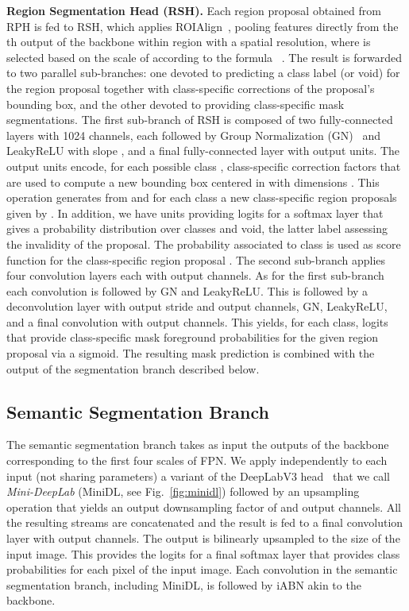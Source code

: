 \documentclass[10pt,twocolumn,letterpaper]{article}
\newcommand{\siABN}{\textrm{iABN}\xspace}
\renewcommand{\paragraph}[1]{
        \vspace{3pt}
	\noindent\textbf{#1}}
\begin{document}
\paragraph{Region Segmentation Head (RSH).}
Each region proposal  obtained from RPH is fed to RSH, which applies ROIAlign~\cite{He2017}, pooling features directly from the th output of the backbone within region  with a  spatial resolution, where  is selected based on the scale of  according to the formula ~\cite{He2017}.
The result is forwarded to two parallel sub-branches: one devoted
to predicting a class label (or void) for the region proposal together with class-specific corrections of the proposal's bounding box, and the other devoted to providing class-specific mask segmentations. 
The first sub-branch of RSH is composed of two fully-connected layers with 1024 channels, each followed by Group Normalization (GN)~\cite{Wu_2018_ECCV} and LeakyReLU with slope , and a final 
fully-connected layer with  output units.
The output units encode, for each possible class , class-specific correction factors  that are used to compute a new bounding box centered in  with dimensions . This operation generates from  and for each class  a new class-specific region proposals given by .
In addition, we have  units providing logits for a softmax layer that gives a probability distribution over classes and void, the latter label assessing the invalidity of the proposal. The probability associated to class  is used as score function  for the class-specific region proposal .
The second sub-branch applies four  convolution layers each with  output channels. As for the first sub-branch each convolution is followed by GN and LeakyReLU.
This is followed by a  deconvolution layer with output stride  and  output channels, GN, LeakyReLU, and a final  convolution with  output channels. This yields, for each class,  logits that provide class-specific mask foreground probabilities for the given region proposal via a sigmoid.
The resulting mask prediction is combined with the output of the segmentation branch described below. 




\subsection{Semantic Segmentation Branch}
\label{sec:sem}
The semantic segmentation branch takes as input the outputs of the backbone corresponding to the first four scales of FPN. We apply independently to each input (not sharing parameters) a variant of the DeepLabV3 head~\cite{Chen2017} that we call \emph{Mini-DeepLab} (MiniDL, see Fig.~\ref{fig:minidl}) followed by an upsampling operation that yields an output downsampling factor of  and  output channels. All the resulting streams are concatenated and the result is fed to a final  convolution layer with  output channels. The output is bilinearly upsampled to the size of the input image. This provides the logits for a final softmax layer that provides class probabilities for each pixel of the input image.
Each convolution in the semantic segmentation branch, including MiniDL, is followed by \siABN akin to the backbone.
\end{document}
